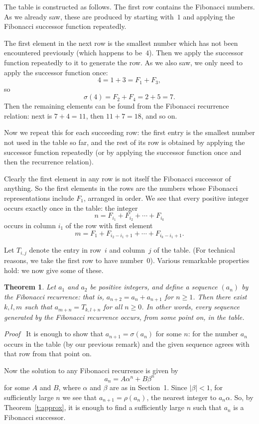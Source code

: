 \documentclass[12pt]{article}
\newtheorem{theorem}{Theorem}[section]
\newcommand{\head}[1]{\medbreak\noindent\textit{#1}\ }
\begin{document}
The table is constructed as follows. The first row contains the
Fibonacci numbers. As we already saw, these are produced by
starting with~$1$ and applying the Fibonacci successor function
repeatedly.

The first element in the next row is the smallest number which
has not been encountered previously (which happens to be~$4$).
Then we apply the successor function repeatedly to it to generate
the row. As we also saw, we only need to apply the successor
function once:
\[4=1+3=F_1+F_3,\]
so
\[\sigma(4)=F_2+F_4=2+5=7.\]
Then the remaining elements can be found from the Fibonacci
recurrence relation: next is $7+4=11$, then $11+7=18$, and so on.

Now we repeat this for each succeeding row: the first entry is the
smallest number not used in the table so far, and the rest of its
row is obtained by applying the successor function repeatedly
(or by applying the successor function once and then the recurrence
relation).

Clearly the first element in any row is not itself the
Fibonacci successor of anything. So the first elements in
the rows are the numbers whose Fibonacci representations include
$F_1$, arranged in order. We see that every positive integer
occurs exactly once in the table: the integer
\[n=F_{i_1}+F_{i_2}+\cdots+F_{i_k}\]
occurs in column $i_1$ of the row with first element
\[m=F_1+F_{i_2-i_1+1}+\cdots+F_{i_k-i_1+1}.\]

Let $T_{i,j}$ denote the entry in row~$i$ and column~$j$ of the table.
(For technical reasons, we take the first row to have number~$0$).
Various remarkable properties hold: we now give some of these.

\begin{theorem}\label{th3_1}
Let $a_1$ and $a_2$ be positive integers, and define a sequence
$(a_n)$ by the Fibonacci recurrence: that is, $a_{n+2}=a_n+a_{n+1}$
for $n\ge1$. Then there exist $k,l,m$ such that $a_{m+n}=T_{k,l+n}$
for all $n\ge0$. In other words, every sequence generated by
the Fibonacci recurrence occurs, from some point on, in the table.
\end{theorem}

\head{Proof} It is enough to show that $a_{n+1}=\sigma(a_n)$ for
some $n$: for the number $a_n$ occurs in the table (by our
previous remark) and the given sequence agrees with that row from
that point on.

Now the solution to any Fibonacci recurrence is given by
\[a_n=A\alpha^n+B\beta^n\]
for some $A$ and $B$, where $\alpha$ and $\beta$ are as in
Section~1. Since $|\beta|<1$, for sufficiently large $n$ we see
that $a_{n+1}=\rho(a_n)$, the nearest integer to $a_n\alpha$.
So, by Theorem~\ref{t:approx}, it is enough to find a sufficiently
large $n$ such that $a_n$ is a Fibonacci successor.
\end{document}
